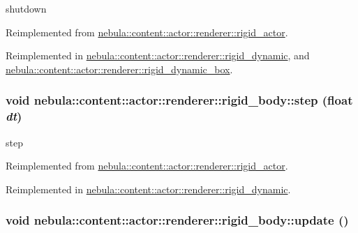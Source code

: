 shutdown 

Reimplemented from \hyperlink{classnebula_1_1content_1_1actor_1_1renderer_1_1rigid__actor_a9d1be32a4ba87de355247219e4e9f104}{nebula::content::actor::renderer::rigid\_\-actor}.

Reimplemented in \hyperlink{classnebula_1_1content_1_1actor_1_1renderer_1_1rigid__dynamic_a6c0f68639544063b7a7bf404fdbc1370}{nebula::content::actor::renderer::rigid\_\-dynamic}, and \hyperlink{classnebula_1_1content_1_1actor_1_1renderer_1_1rigid__dynamic__box_a45f52d77d1f89e86d5ac3cd2d0beb4c0}{nebula::content::actor::renderer::rigid\_\-dynamic\_\-box}.\hypertarget{classnebula_1_1content_1_1actor_1_1renderer_1_1rigid__body_a5e76495c7870d3b88c5b32888f9fa504}{
\subsubsection[{step}]{\setlength{\rightskip}{0pt plus 5cm}void nebula::content::actor::renderer::rigid\_\-body::step (float {\em dt})}}
\label{classnebula_1_1content_1_1actor_1_1renderer_1_1rigid__body_a5e76495c7870d3b88c5b32888f9fa504}


step 

Reimplemented from \hyperlink{classnebula_1_1content_1_1actor_1_1renderer_1_1rigid__actor_a4e0cda8bb08115a62cbb8363ac439608}{nebula::content::actor::renderer::rigid\_\-actor}.

Reimplemented in \hyperlink{classnebula_1_1content_1_1actor_1_1renderer_1_1rigid__dynamic_a2ba4e3e381092c03c39d21248d635621}{nebula::content::actor::renderer::rigid\_\-dynamic}.\hypertarget{classnebula_1_1content_1_1actor_1_1renderer_1_1rigid__body_a11f37d90346888f7dc70cae54954a584}{
\subsubsection[{update}]{\setlength{\rightskip}{0pt plus 5cm}void nebula::content::actor::renderer::rigid\_\-body::update ()}}
\label{classnebula_1_1content_1_1actor_1_1renderer_1_1rigid__body_a11f37d90346888f7dc70cae54954a584}


